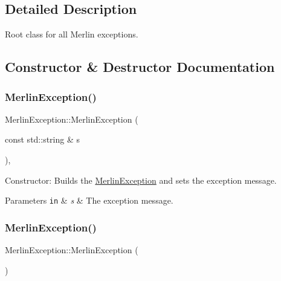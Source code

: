 \subsection{Detailed Description}
Root class for all Merlin exceptions. 

\subsection{Constructor \& Destructor Documentation}
\mbox{\label{classMerlinException_afddab52b70c55154ca28da753db48e02}} 
\subsubsection{\texorpdfstring{Merlin\+Exception()}{MerlinException()}\hspace{0.1cm}{\footnotesize\ttfamily [1/2]}}
{\footnotesize\ttfamily Merlin\+Exception\+::\+Merlin\+Exception (\begin{DoxyParamCaption}\item[{const std\+::string \&}]{s }\end{DoxyParamCaption})\hspace{0.3cm}{\ttfamily [inline]}, {\ttfamily [explicit]}}

Constructor\+: Builds the \hyperlink{classMerlinException}{Merlin\+Exception} and sets the exception message. 
\begin{DoxyParams}[1]{Parameters}
\mbox{\tt in}  & {\em s} & The exception message. \\
\hline
\end{DoxyParams}
\mbox{\label{classMerlinException_a3980e824be4eabd76fd2cbcbcd1e0bc0}} 
\subsubsection{\texorpdfstring{Merlin\+Exception()}{MerlinException()}\hspace{0.1cm}{\footnotesize\ttfamily [2/2]}}
{\footnotesize\ttfamily Merlin\+Exception\+::\+Merlin\+Exception (\begin{DoxyParamCaption}{ }\end{DoxyParamCaption})\hspace{0.3cm}{\ttfamily [inline]}}

